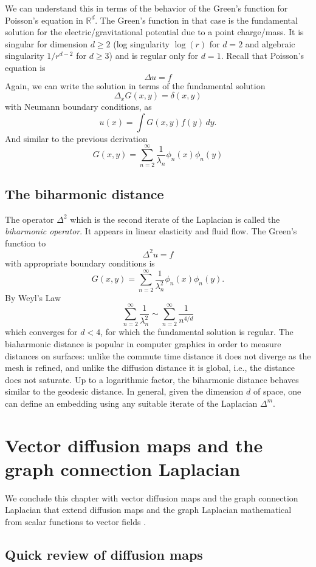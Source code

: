 We can understand this in terms of the behavior of the Green's function for Poisson's equation in $\mathbb{R}^d$. The Green's function in that case is the fundamental solution for the electric/gravitational potential due to a point charge/mass. It is singular for dimension $d\geq 2$ (log singularity $\log(r)$ for $d=2$ and algebraic singularity $1/r^{d-2}$ for $d\geq 3$) and is regular only for $d=1$. Recall that Poisson's equation is
$$\Delta u = f$$
Again, we can write the solution in terms of the fundamental solution
$$\Delta_x G(x,y) = \delta(x,y)$$
with Neumann boundary conditions, as
$$u(x) = \int G(x,y)f(y)\,dy.$$
And similar to the previous derivation
$$G(x,y) = \sum_{n=2}^\infty \frac{1}{\lambda_n}\phi_n(x)\phi_n(y)$$


\subsection{The biharmonic distance}
The operator $\Delta^2$ which is the second iterate of the Laplacian is called the {\textit{biharmonic operator}}. It appears in linear elasticity and fluid flow. The Green's function to
$$\Delta^2 u = f$$
with appropriate boundary conditions is
$$G(x,y) = \sum_{n=2}^\infty \frac{1}{\lambda_n^2}\phi_n(x)\phi_n(y).$$
By Weyl's Law
$$\sum_{n=2}^\infty \frac{1}{\lambda_n^2} \sim \sum_{n=2}^\infty \frac{1}{n^{4/d}}$$
which converges for $d < 4$, for which the fundamental solution is regular. The biaharmonic distance is popular in computer graphics in order to measure distances on surfaces: unlike the commute time distance it does not diverge as the mesh is refined, and unlike the diffusion distance it is global, i.e., the distance does not saturate. Up to a logarithmic factor, the biharmonic distance behaves similar to the geodesic distance.  In general, given the dimension $d$ of space, one can define an embedding using any suitable iterate of the Laplacian $\Delta^m$.



\section{Vector diffusion maps and the graph connection Laplacian}\label{s:vectordiffusionmap}

We conclude this chapter with vector diffusion maps and the graph connection Laplacian that extend diffusion maps and the graph Laplacian mathematical from scalar functions to vector fields \cite{ASinger_HTWu_2011_VDM}. 

\subsection{Quick review of diffusion maps}

